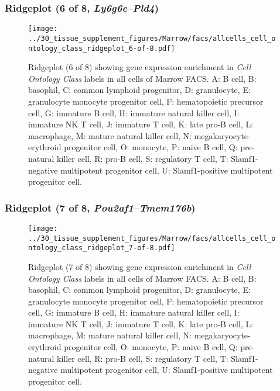 \subsubsection{Ridgeplot (6 of 8, \emph{Ly6g6e}--\emph{Pld4})}
\begin{figure}[h]
\centering
\texttt{[image: ../30\_tissue\_supplement\_figures/Marrow/facs/allcells\_cell\_ontology\_class\_ridgeplot\_6-of-8.pdf]}

\caption{ Ridgeplot (6 of 8)  showing gene expression enrichment in \emph{Cell Ontology Class} labels in all cells of Marrow FACS. A: B cell, B: basophil, C: common lymphoid progenitor, D: granulocyte, E: granulocyte monocyte progenitor cell, F: hematopoietic precursor cell, G: immature B cell, H: immature natural killer cell, I: immature NK T cell, J: immature T cell, K: late pro-B cell, L: macrophage, M: mature natural killer cell, N: megakaryocyte-erythroid progenitor cell, O: monocyte, P: naive B cell, Q: pre-natural killer cell, R: pro-B cell, S: regulatory T cell, T: Slamf1-negative multipotent progenitor cell, U: Slamf1-positive multipotent progenitor cell.}
\end{figure}


\clearpage

\subsubsection{Ridgeplot (7 of 8, \emph{Pou2af1}--\emph{Tmem176b})}
\begin{figure}[h]
\centering
\texttt{[image: ../30\_tissue\_supplement\_figures/Marrow/facs/allcells\_cell\_ontology\_class\_ridgeplot\_7-of-8.pdf]}

\caption{ Ridgeplot (7 of 8)  showing gene expression enrichment in \emph{Cell Ontology Class} labels in all cells of Marrow FACS. A: B cell, B: basophil, C: common lymphoid progenitor, D: granulocyte, E: granulocyte monocyte progenitor cell, F: hematopoietic precursor cell, G: immature B cell, H: immature natural killer cell, I: immature NK T cell, J: immature T cell, K: late pro-B cell, L: macrophage, M: mature natural killer cell, N: megakaryocyte-erythroid progenitor cell, O: monocyte, P: naive B cell, Q: pre-natural killer cell, R: pro-B cell, S: regulatory T cell, T: Slamf1-negative multipotent progenitor cell, U: Slamf1-positive multipotent progenitor cell.}
\end{figure}


\clearpage

